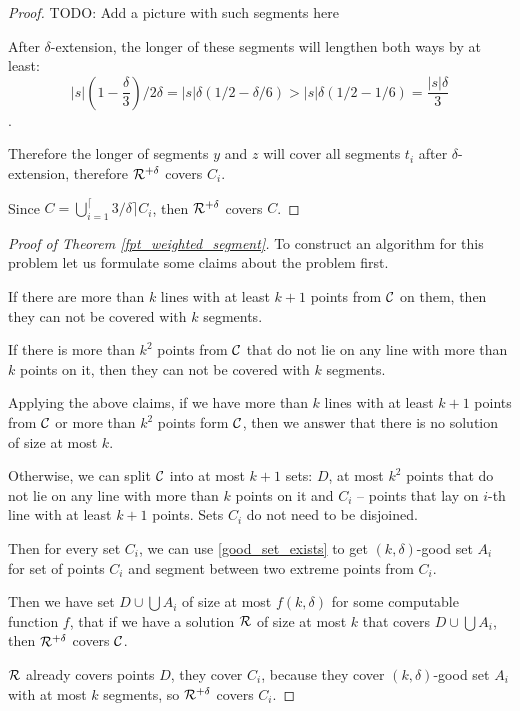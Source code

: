 \begin{proof}
TODO: Add a picture with such segments here

After $\delta$-extension, the longer of these segments will
lengthen both ways by at least:
$$|s|(1-\frac{\delta}{3})/2\delta = |s|\delta(1/2 - \delta/6) > |s|\delta(1/2 - 1/6) = \frac{|s|\delta}{3}$$.

Therefore the longer of segments $y$ and $z$ will cover all segments $t_i$
after $\delta$-extension, therefore $\mathcal{R}^{+\delta}$ covers $C_i$.

Since $C = \bigcup_{i=1}^\lceil3/\delta\rceil C_i$,
then $\mathcal{R}^{+\delta}$ covers $C$.

\end{proof}

\begin{proof}[Proof of Theorem \ref{fpt_weighted_segment}]

To construct an algorithm for this problem let us formulate
some claims about the problem first.

\begin{claim}
If there are more than $k$ lines with
at least $k+1$ points from $\mathcal{C}$ on them, then 
they can not be covered with $k$ segments.
\end{claim}

\begin{claim}
If there is more than $k^2$ points from $\mathcal{C}$
that do not lie on any line with more than $k$
points on it, then they can not be covered with $k$ segments.
\end{claim}

Applying the above claims, if we have more than $k$ lines
with at least $k+1$ points from $\mathcal{C}$
or more than $k^2$ points form $\mathcal{C}$, then we answer that
there is no solution of size at most $k$.

Otherwise, we can split $\mathcal{C}$ into at most $k+1$ sets:
$D$, at most $k^2$ points that do not lie on any line with
more than $k$ points on it and $C_i$ -- points
that lay on $i$-th line with at least $k+1$ points.
Sets $C_i$ do not need to be disjoined.

Then for every set $C_i$, we can use \ref{good_set_exists}
to get $(k,\delta)$-good set $A_i$
for set of points $C_i$ and segment between two extreme points from $C_i$.

Then we have set $D \cup \bigcup A_i$ of size at most $f(k, \delta)$
for some computable function $f$, that if we have a solution $\mathcal{R}$ of size at most $k$
that covers $D \cup \bigcup A_i$, then $\mathcal{R}^{+\delta}$ covers $\mathcal{C}$.

$\mathcal{R}$ already covers points $D$, they cover $C_i$, because
they cover $(k,\delta)$-good set $A_i$ with at most $k$ segments,
so $\mathcal{R}^{+\delta}$ covers $C_i$.

\end{proof}


